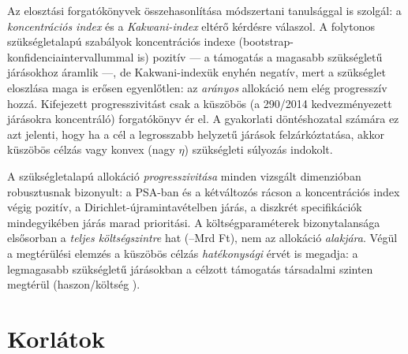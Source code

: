 \documentclass[11pt,a4paper]{article}
\begin{document}
Az elosztási forgatókönyvek összehasonlítása módszertani tanulsággal is
szolgál: a \emph{koncentrációs index} és a \emph{Kakwani-index} eltérő
kérdésre válaszol. A folytonos szükségletalapú szabályok koncentrációs
indexe (bootstrap-konfidenciaintervallummal is) pozitív --- a támogatás a
magasabb szükségletű járásokhoz áramlik ---, de Kakwani-indexük enyhén
negatív, mert a szükséglet eloszlása maga is erősen egyenlőtlen: az
\emph{arányos} allokáció nem elég progresszív hozzá. Kifejezett
progresszivitást csak a küszöbös (a 290/2014 kedvezményezett járásokra
koncentráló) forgatókönyv ér el. A gyakorlati döntéshozatal számára ez azt
jelenti, hogy ha a cél a legrosszabb helyzetű járások felzárkóztatása, akkor
küszöbös célzás vagy konvex (nagy $\eta$) szükségleti súlyozás indokolt.

A szükségletalapú allokáció \emph{progresszivitása} minden vizsgált
dimenzióban robusztusnak bizonyult: a PSA-ban és a kétváltozós rácson a
koncentrációs index végig pozitív, a Dirichlet-újramintavételben
\nRobustPriority{} járás, a diszkrét specifikációk mindegyikében
\nSpecRobust{} járás marad prioritási. A költségparaméterek bizonytalansága
elsősorban a \emph{teljes költségszintre} hat (\psaCostLo--\psaCostHi Mrd
Ft), nem az allokáció \emph{alakjára}. Végül a megtérülési elemzés a
küszöbös célzás \emph{hatékonysági} érvét is megadja: a legmagasabb
szükségletű járásokban a célzott támogatás társadalmi szinten megtérül
(haszon/költség \ceBcrTopNeed).

\section{Korlátok}
\end{document}
